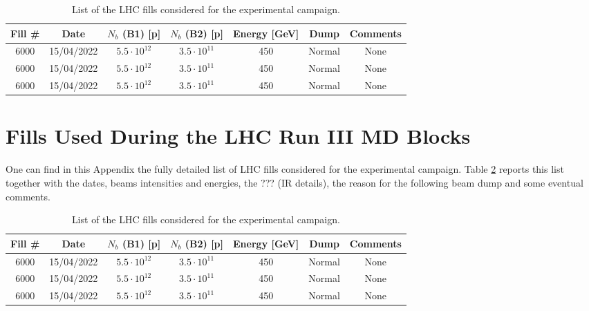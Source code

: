 \begin{table}[!hbt]
    \centering
    \begin{tabular}{|c|c|c|c|c|c|c|}
        \toprule
        \textbf{Fill \#} & \textbf{Date} & \textbf{$N_b$ (B1) [p]} & \textbf{$N_b$ (B2) [p]} & \textbf{Energy [GeV]} & \textbf{Dump} & \textbf{Comments} \\
        \midrule
            6000  &  15/04/2022  &  $5.5 \cdot 10^{12}$  &  $3.5 \cdot 10^{11}$  &  450  &  Normal  &  None  \\
            6000  &  15/04/2022  &  $5.5 \cdot 10^{12}$  &  $3.5 \cdot 10^{11}$  &  450  &  Normal  &  None  \\
            6000  &  15/04/2022  &  $5.5 \cdot 10^{12}$  &  $3.5 \cdot 10^{11}$  &  450  &  Normal  &  None  \\
        \bottomrule
    \end{tabular}
    \caption{List of the LHC fills considered for the experimental campaign.}
    \label{table:experimental_fills}
 \end{table}

 \section{Fills Used During the LHC Run III MD Blocks}

 One can find in this Appendix the fully detailed list of LHC fills considered for the experimental campaign.
 Table \ref{table:experimental_fills} reports this list together with the dates, beams intensities and energies, the ??? (IR details), the reason for the following beam dump and some eventual comments.
 
 \begin{table}[!hbt]
     \centering
     \begin{tabular}{|c|c|c|c|c|c|c|}
         \toprule
         \textbf{Fill \#} & \textbf{Date} & \textbf{$N_b$ (B1) [p]} & \textbf{$N_b$ (B2) [p]} & \textbf{Energy [GeV]} & \textbf{Dump} & \textbf{Comments} \\
         \midrule
             6000  &  15/04/2022  &  $5.5 \cdot 10^{12}$  &  $3.5 \cdot 10^{11}$  &  450  &  Normal  &  None  \\
             6000  &  15/04/2022  &  $5.5 \cdot 10^{12}$  &  $3.5 \cdot 10^{11}$  &  450  &  Normal  &  None  \\
             6000  &  15/04/2022  &  $5.5 \cdot 10^{12}$  &  $3.5 \cdot 10^{11}$  &  450  &  Normal  &  None  \\
         \bottomrule
     \end{tabular}
     \caption{List of the LHC fills considered for the experimental campaign.}
     \label{table:experimental_fills}
  \end{table}
